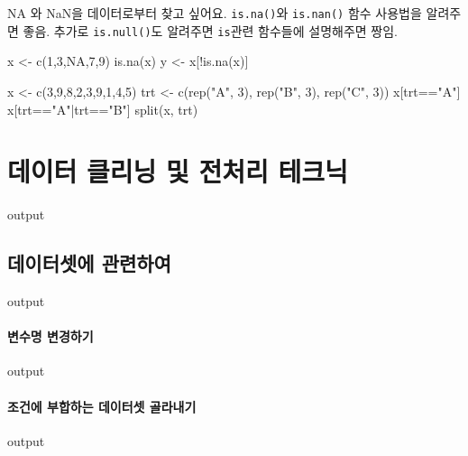 \documentclass{book}
\begin{document}
NA 와 NaN을 데이터로부터 찾고 싶어요. 
\texttt{is.na()}와 \texttt{is.nan()} 함수 사용법을 알려주면 좋음.  추가로 \texttt{is.null()}도 알려주면 \texttt{is}관련 함수들에 설명해주면 짱임.

\begin{Schunk}
\begin{Soutput}
x <- c(1,3,NA,7,9)
is.na(x)
y <- x[!is.na(x)]

x <- c(3,9,8,2,3,9,1,4,5)
trt <- c(rep("A", 3), rep("B", 3), rep("C", 3))
x[trt=="A"]
x[trt=="A"|trt=="B"]
split(x, trt)

\end{Soutput}
\end{Schunk}

\section{데이터 클리닝 및 전처리 테크닉}

\begin{Schunk}
\begin{Soutput}
output
\end{Soutput}
\end{Schunk}

\subsection{데이터셋에 관련하여}

\begin{Schunk}
\begin{Soutput}
output
\end{Soutput}
\end{Schunk}

\paragraph{변수명 변경하기}
\begin{Schunk}
\begin{Soutput}
output
\end{Soutput}
\end{Schunk}

\paragraph{조건에 부합하는 데이터셋 골라내기}
\begin{Schunk}
\begin{Soutput}
output
\end{Soutput}
\end{Schunk}
\end{document}

